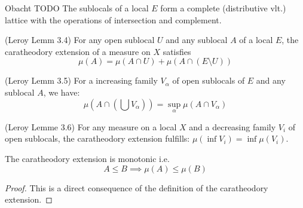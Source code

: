 \begin{proposition}
    Obacht TODO
    \label{prop:sublocals_structure}
    The sublocals of a local $E$ form a complete (distributive vlt.) lattice with the operations of intersection and complement.
\end{proposition}


\begin{lemma}[Property 2]
(Leroy Lemm 3.4)
    \label{lem:property_2}
    For any open sublocal $U$ and any sublocal $A$ of a local $E$, the caratheodory extension of a measure on $X$ satisfies \[\mu(A) = \mu(A \cap U) + \mu(A \cap(E\setminus U))\]
\end{lemma}

\begin{lemma}[Property 3]
(Leroy Lemm 3.5)
    \label{lem:property_3}
    For a increasing family $V_{\alpha}$ of open sublocals of $E$ and any sublocal $A$, we have:
    \[\mu(A \cap(\bigcup V_{\alpha})) = \sup_\alpha \mu(A\cap V_\alpha)\]
\end{lemma}


\begin{lemma}
(Leroy Lemme 3.6)
    \label{lem:commutes_with_inf_opens}
    For any measure on a local $X$ and a decreasing family $V_i$ of open sublocals, the caratheodory extension fulfills: $\mu (\inf V_i) = \inf \mu(V_i)$.
\end{lemma}

\begin{lemma}
    \label{lem:monotonic}
    \leanok
    The caratheodory extension is monotonic i.e. \[A \le B \implies \mu (A) \le \mu (B)\]
\end{lemma}
\begin{proof}
    \leanok
    This is a direct consequence of the definition of the caratheodory extension.
\end{proof}

